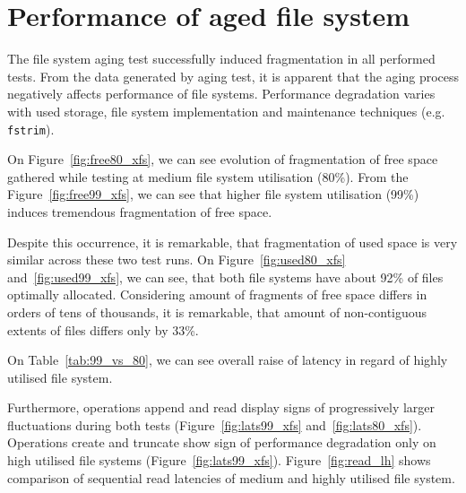 \documentclass[
  color, %
  table, %
  lof,   %
  lot,   %
]{fithesis3}
\begin{document}
\section{Performance of aged file system}
The file system aging test successfully induced fragmentation in all performed tests. From the data generated by aging test, it is apparent that the aging process negatively affects performance of file systems. Performance degradation varies with used storage, file system implementation and maintenance techniques (e.g. \texttt{fstrim}).

On Figure~\ref{fig:free80_xfs}, we can see evolution of fragmentation of free space gathered while testing at medium file system utilisation (80\%). From the Figure~\ref{fig:free99_xfs}, we can see that higher file system utilisation (99\%) induces tremendous fragmentation of free space.

Despite this occurrence, it is remarkable, that fragmentation of used space is very similar across these two test runs. On Figure~\ref{fig:used80_xfs} and~\ref{fig:used99_xfs}, we can see, that both file systems have about 92\% of files optimally allocated. Considering amount of fragments of free space differs in orders of tens of thousands, it is remarkable, that amount of non-contiguous extents of files differs only by 33\%.

On Table~\ref{tab:99_vs_80}, we can see overall raise of latency in regard of highly utilised file system.

Furthermore, operations append and read display signs of progressively larger fluctuations during both tests (Figure~\ref{fig:lats99_xfs} and~\ref{fig:lats80_xfs}). Operations create and truncate show sign of performance degradation only on high utilised file systems (Figure~\ref{fig:lats99_xfs}). Figure~\ref{fig:read_lh} shows comparison of sequential read latencies of medium and highly utilised file system.
\end{document}
